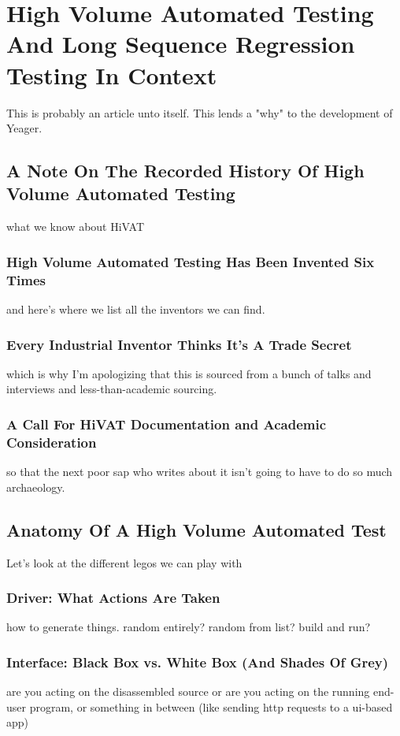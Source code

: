 \chapter{High Volume Automated Testing And Long Sequence Regression Testing In Context}
This is probably an article unto itself. This lends a "why" to the development of Yeager.

\section{A Note On The Recorded History Of High Volume Automated Testing}
what we know about HiVAT

\subsection{High Volume Automated Testing Has Been Invented Six Times}
and here's where we list all the inventors we can find.
\citep{miller1990empirical}

\subsection{Every Industrial Inventor Thinks It's A Trade Secret}
which is why I'm apologizing that this is sourced from a bunch of talks and interviews and less-than-academic sourcing.

\subsection{A Call For HiVAT Documentation and Academic Consideration}
so that the next poor sap who writes about it isn't going to have to do so much archaeology.

\section{Anatomy Of A High Volume Automated Test}
Let's look at the different legos we can play with

\subsection{Driver: What Actions Are Taken}
how to generate things. random entirely? random from list? build and run?

\subsection{Interface: Black Box vs. White Box (And Shades Of Grey)}
are you acting on the disassembled source or are you acting on the running end-user program, or something in between (like sending http requests to a ui-based app)

